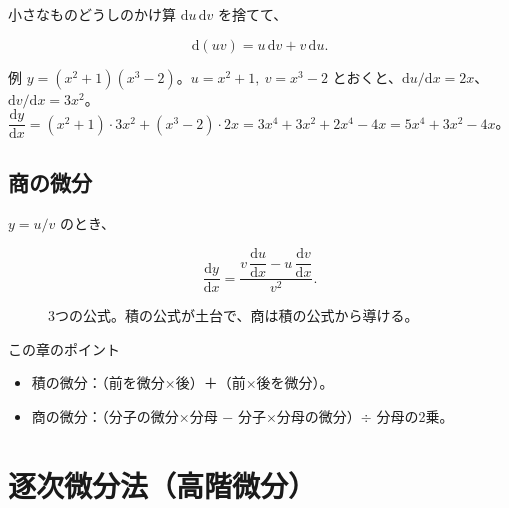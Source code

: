 \documentclass[a4paper,11pt,openany]{ltjsbook}
\newcommand{\dd}{\mathrm{d}}
\begin{document}
小さなものどうしのかけ算 $\dd u\,\dd v$ を捨てて、

\[
\dd(uv)=u\,\dd v+v\,\dd u.
\]

\begin{examplebox}{例}
$y=(x^2+1)(x^3-2)$。$u=x^2+1,\ v=x^3-2$ とおくと、$\dd u/\dd x=2x$、$\dd v/\dd x=3x^2$。\\
$\dfrac{\dd y}{\dd x}=(x^2+1)\cdot3x^2+(x^3-2)\cdot2x=3x^4+3x^2+2x^4-4x=5x^4+3x^2-4x$。
\end{examplebox}

\section{商の微分}

$y=u/v$ のとき、

\[
\frac{\dd y}{\dd x}=\frac{v\,\dfrac{\dd u}{\dd x}-u\,\dfrac{\dd v}{\dd x}}{v^2}.
\]

\begin{figure}[htbp]
\centering
{}
\caption{3つの公式。積の公式が土台で、商は積の公式から導ける。}
\end{figure}

\begin{pointbox}{この章のポイント}
\begin{itemize}[leftmargin=1.5em]
\item 積の微分：（前を微分×後）＋（前×後を微分）。
\item 商の微分：（分子の微分×分母 $-$ 分子×分母の微分）$\div$ 分母の2乗。
\end{itemize}
\end{pointbox}

\chapter{逐次微分法（高階微分）}
\end{document}
